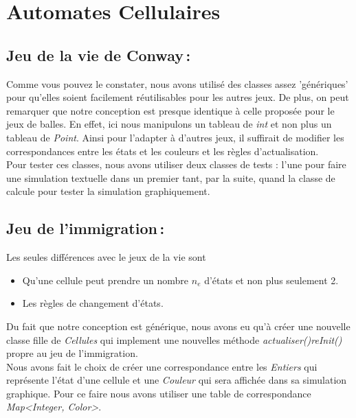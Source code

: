 \documentclass[a4paper, 10pt, french]{article}
\begin{document}
\section{Automates Cellulaires}
	\subsection{Jeu de la vie de Conway\,: }
		{Comme vous pouvez le constater, nous avons utilisé des classes assez 'génériques' pour qu'elles soient facilement réutilisables pour les autres jeux. De plus, on peut remarquer que notre conception est presque identique à celle proposée pour le jeux de balles. En effet, ici nous manipulons un tableau de {\em int} et non plus un tableau de {\em Point}. Ainsi pour l'adapter à d'autres jeux, il suffirait de modifier les correspondances entre les états et les couleurs et les règles d'actualisation.
\\ \indent Pour tester ces classes, nous avons utiliser deux classes de tests : l'une pour faire une simulation textuelle dans un premier tant, par la suite, quand la classe de calcule pour tester la simulation graphiquement.
		} 
\subsection{Jeu de l'immigration\,:}
	{
Les seules différences avec le jeux de la vie sont 
	\begin{itemize}
		\item Qu'une cellule peut prendre un nombre {\em $n_e$} d'états et non plus seulement 2.
		\item Les règles de changement d'états.
	\end{itemize}
\indent Du fait que notre conception est générique, nous avons eu qu'à créer une nouvelle classe fille de {\em Cellules} qui implement une nouvelles méthode {\em actualiser()}{\em reInit()} propre au jeu de l'immigration. 
\\ \indent Nous avons fait le choix de créer une correspondance entre les {\em Entiers} qui représente l'état d'une cellule et une {\em Couleur} qui sera affichée dans sa simulation graphique. Pour ce faire nous avons utiliser une table de correspondance {\em Map<Integer, Color>}.
	}
\end{document}
